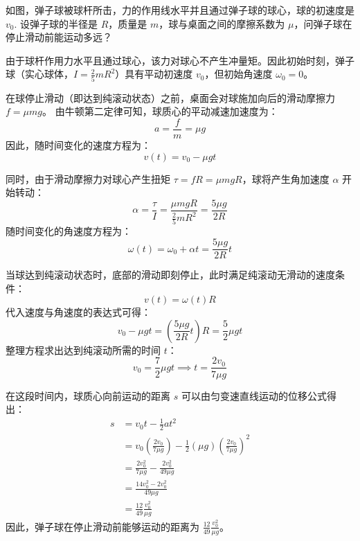 \begin{exercise}\label{ex:6.7}
如图，弹子球被球杆所击，力的作用线水平并且通过弹子球的球心，球的初速度是 $v_0$. 设弹子球的半径是 $R$，质量是 $m$，球与桌面之间的摩擦系数为 $\mu$，问弹子球在停止滑动前能运动多远？
\begin{center}
\end{center}
\end{exercise}
\begin{solution}
由于球杆作用力水平且通过球心，该力对球心不产生冲量矩。因此初始时刻，弹子球（实心球体，$I = \frac{2}{5} m R^2$）具有平动初速度 $v_0$，但初始角速度 $\omega_0 = 0$。

在球停止滑动（即达到纯滚动状态）之前，桌面会对球施加向后的滑动摩擦力 $f = \mu m g$。
由牛顿第二定律可知，球质心的平动减速加速度为：
$$ a = \frac{f}{m} = \mu g $$
因此，随时间变化的速度方程为：
$$ v(t) = v_0 - \mu g t $$

同时，由于滑动摩擦力对球心产生扭矩 $\tau = f R = \mu m g R$，球将产生角加速度 $\alpha$ 开始转动：
$$ \alpha = \frac{\tau}{I} = \frac{\mu m g R}{\frac{2}{5} m R^2} = \frac{5 \mu g}{2 R} $$
随时间变化的角速度方程为：
$$ \omega(t) = \omega_0 + \alpha t = \frac{5 \mu g}{2 R} t $$

当球达到纯滚动状态时，底部的滑动即刻停止，此时满足纯滚动无滑动的速度条件：
$$ v(t) = \omega(t) R $$
代入速度与角速度的表达式可得：
$$ v_0 - \mu g t = \left( \frac{5 \mu g}{2 R} t \right) R = \frac{5}{2} \mu g t $$
整理方程求出达到纯滚动所需的时间 $t$：
$$ v_0 = \frac{7}{2} \mu g t \implies t = \frac{2 v_0}{7 \mu g} $$

在这段时间内，球质心向前运动的距离 $s$ 可以由匀变速直线运动的位移公式得出：
\begin{align*}
    s &= v_0 t - \frac{1}{2} a t^2 \\
      &= v_0 \left( \frac{2 v_0}{7 \mu g} \right) - \frac{1}{2} (\mu g) \left( \frac{2 v_0}{7 \mu g} \right)^2 \\
      &= \frac{2 v_0^2}{7 \mu g} - \frac{2 v_0^2}{49 \mu g} \\
      &= \frac{14 v_0^2 - 2 v_0^2}{49 \mu g} \\
      &= \frac{12}{49} \frac{v_0^2}{\mu g}
\end{align*}
因此，弹子球在停止滑动前能够运动的距离为 $\frac{12}{49} \frac{v_0^2}{\mu g}$。\end{solution}

